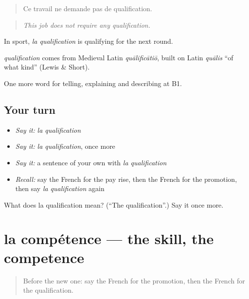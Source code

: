 \begin{quote}
Ce travail ne demande pas de qualification.
\end{quote}

\begin{quote}
\emph{This job does not require any qualification.}
\end{quote}

In sport, \emph{la qualification} is qualifying for the next round.

\begin{cousinweb}
\emph{qualification} comes from Medieval Latin \emph{quālificātiō}, built on Latin \emph{quālis} \textquotedblleft{}of what kind\textquotedblright{} (Lewis \& Short).
\end{cousinweb}

\begin{grammarlens}[title={What you've built}]
One more word for telling, explaining and describing at B1.
\end{grammarlens}

\subsection*{Your turn}
\begin{itemize}
\raggedright
  \item \emph{Say it:} \emph{la qualification}
  \item \emph{Say it:} \emph{la qualification}, once more
  \item \emph{Say it:} a sentence of your own with \emph{la qualification}
  \item \emph{Recall:} say the French for the pay rise, then the French for the promotion, then say \emph{la qualification} again
\end{itemize}

\begin{tcolorbox}[breakable,colback=teal!4,colframe=teal!35!black,title={Before you move on}]
What does la qualification mean? (\textquotedblleft{}The qualification\textquotedblright{}.) Say it once more.
\end{tcolorbox}
\section[la compétence]{la compétence — the skill, the competence}

\label{lesson:FR-C360-competence}



\begin{quote}
Before the new one: say the French for the promotion, then the French for the qualification.
\end{quote}

